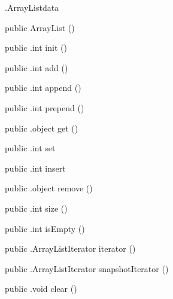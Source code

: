 \begin{CrexxClass}{.ArrayList}{data}

  \begin{Hierarchy}
  \end{Hierarchy}

  \begin{Members}

    \Factory
      {public}
      {ArrayList}
      {()}

    \Method
      {public}
      {.int}
      {init}
      {()}

    \Method
      {public}
      {.int}
      {add}
      {()}

    \Method
      {public}
      {.int}
      {append}
      {()}

    \Method
      {public}
      {.int}
      {prepend}
      {()}

    \Method
      {public}
      {.object}
      {get}
      {()}

    \Method
      {public}
      {.int}
      {set}
      {}

    \Method
      {public}
      {.int}
      {insert}
      {}

    \Method
      {public}
      {.object}
      {remove}
      {()}

    \Method
      {public}
      {.int}
      {size}
      {()}

    \Method
      {public}
      {.int}
      {isEmpty}
      {()}

    \Method
      {public}
      {.ArrayListIterator}
      {iterator}
      {()}

    \Method
      {public}
      {.ArrayListIterator}
      {snapshotIterator}
      {()}

    \Method
      {public}
      {.void}
      {clear}
      {()}

  \end{Members}
\end{CrexxClass}

